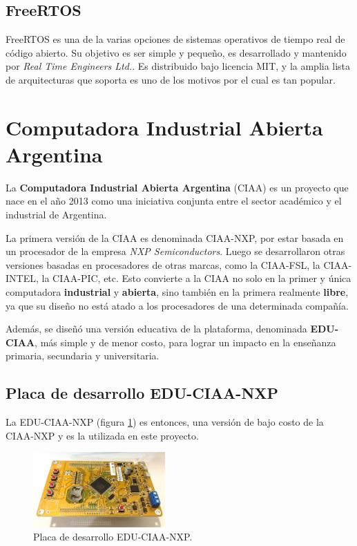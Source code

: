 \documentclass{IEEEtran}
\begin{document}
\subsection{FreeRTOS}
FreeRTOS es una de la varias opciones de sistemas operativos de tiempo real de código abierto. Su objetivo es ser simple y pequeño, es desarrollado y mantenido por \textit{Real Time Engineers Ltd.}. Es distribuido bajo licencia MIT, y la amplia lista de arquitecturas que soporta es uno de los motivos por el cual es tan popular.

\section{Computadora Industrial Abierta Argentina}
La \textbf{Computadora Industrial Abierta Argentina} (CIAA) es un proyecto que nace en el año 2013 como una iniciativa conjunta entre el sector académico y el industrial de Argentina.

La primera versión de la CIAA es denominada CIAA-NXP, por estar basada en un procesador de la empresa \textit{NXP Semiconductors}. Luego se desarrollaron otras versiones basadas en procesadores de otras marcas, como la CIAA-FSL, la CIAA-INTEL, la CIAA-PIC, etc. Esto convierte a la CIAA no solo en la primer y única computadora \textbf{industrial} y \textbf{abierta}, sino también en la primera realmente \textbf{libre}, ya que su diseño no está atado a los procesadores de una determinada compañía.

Además, se diseñó una versión educativa de la plataforma, denominada \textbf{EDU-CIAA}, más simple y de menor costo, para lograr un impacto en la enseñanza primaria, secundaria y universitaria.

\subsection{Placa de desarrollo EDU-CIAA-NXP}
La EDU-CIAA-NXP (figura \ref{fig:edu-ciaa}) es entonces, una versión de bajo costo de la CIAA-NXP y es la utilizada en este proyecto.

\begin{figure}[ht]
    \centering
    \includegraphics[width=0.45\textwidth]{../edu_ciaa.jpg}
    \caption{Placa de desarrollo EDU-CIAA-NXP.}
    \label{fig:edu-ciaa}
\end{figure}
\end{document}
